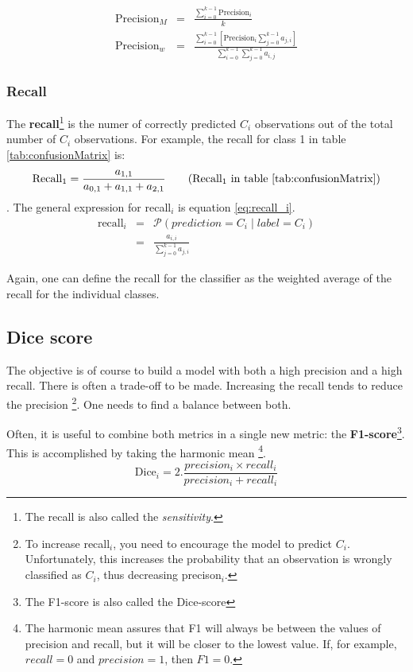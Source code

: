 \begin{eqnarray}
    \text{Precision}_M &=& \frac{\sum_{i=0}^{k-1} \text{Precision}_i}{k}  \\
    \text{Precision}_w &=& \frac{\sum_{i=0}^{k-1} \left[ \text{Precision}_i \sum_{j=0}^{k-1} a_{j,i} \right] }{\sum_{i=0}^{k-1} \sum_{j=0}^{k-1} a_{i,j} }  
\end{eqnarray}


\subsubsection{Recall}

The \textbf{recall}\footnote{The recall is also called the \textit{sensitivity}.} is the numer of correctly predicted $C_i$ observations out of the total number of $C_i$ observations.
For example, the recall for class 1 in table \ref{tab:confusionMatrix} is:
\begin{equation}
    \text{Recall}_1 = \frac{a_{1,1}}{a_{0,1} + a_{1,1} + a_{2, 1}} \tag{Recall$_1$ in table \ref{tab:confusionMatrix}}
\end{equation}.
The general expression for recall$_i$ is equation \ref{eq:recall_i}.
\begin{eqnarray}
    \text{recall}_i &=& \mathcal{P} \left( prediction = C_i \mid label = C_i \right) \\
    &=& \frac{a_{i, i}}{\sum_{j=0}^{k-1} a_{j, i}} \label{eq:recall_i}
\end{eqnarray}

Again, one can define the recall for the classifier as the weighted average of the recall for the individual classes.

\subsection{Dice score}

The objective is of course to build a model with both a high precision and a high recall.
There is often a trade-off to be made. 
Increasing the recall tends to reduce the precision
\footnote{To increase recall$_i$, you need to encourage the model to predict $C_i$. Unfortunately, this increases the probability that an observation is wrongly classified as $C_i$, thus decreasing precison$_i$.}.
One needs to find a balance between both.

Often, it is useful to combine both metrics in a single new metric: the \textbf{F1-score}\footnote{The F1-score is also called the Dice-score}. This is accomplished by taking the harmonic mean
\footnote{The harmonic mean assures that F1 will always be between the values of precision and recall, but it will be closer to the lowest value. If, for example, $recall=0$ and $precision=1$, then $F1=0$.}.
\begin{equation}
    \text{Dice}_i = 2 . \frac{precision_i \times recall_i }{precision_i + recall_i }
\end{equation}

